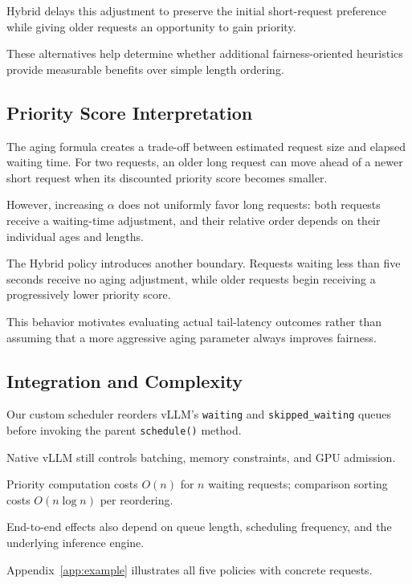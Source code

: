 \documentclass[sigplan,nonacm]{acmart}
\begin{document}
Hybrid delays this adjustment to preserve the
initial short-request preference while giving
older requests an opportunity to gain priority.

These alternatives help determine whether
additional fairness-oriented heuristics provide
measurable benefits over simple length ordering.

\subsection{Priority Score Interpretation}

The aging formula creates a trade-off between
estimated request size and elapsed waiting time.
For two requests, an older long request can move
ahead of a newer short request when its discounted
priority score becomes smaller.

However, increasing $\alpha$ does not uniformly
favor long requests: both requests receive a
waiting-time adjustment, and their relative order
depends on their individual ages and lengths.

The Hybrid policy introduces another boundary.
Requests waiting less than five seconds receive
no aging adjustment, while older requests begin
receiving a progressively lower priority score.

This behavior motivates evaluating actual
tail-latency outcomes rather than assuming that
a more aggressive aging parameter always
improves fairness.

\subsection{Integration and Complexity}

Our custom scheduler reorders vLLM's
\texttt{waiting} and
\texttt{skipped\_waiting} queues before invoking
the parent \texttt{schedule()} method.

Native vLLM still controls batching,
memory constraints, and GPU admission.

Priority computation costs $O(n)$ for $n$
waiting requests; comparison sorting costs
$O(n\log n)$ per reordering.

End-to-end effects also depend on queue length,
scheduling frequency, and the underlying
inference engine.

Appendix~\ref{app:example} illustrates all
five policies with concrete requests.

\end{document}
